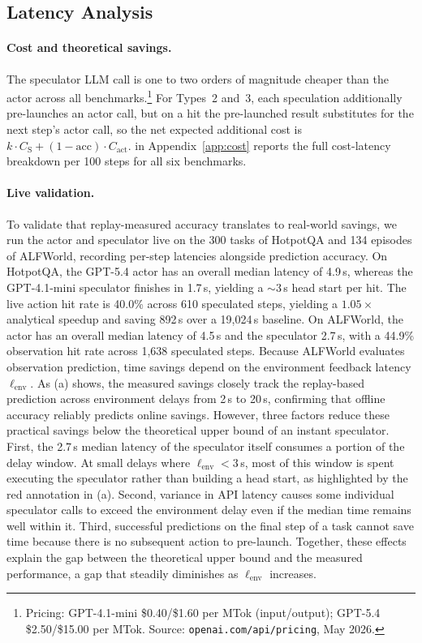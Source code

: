 \documentclass{article}
\begin{document}
\subsection{Latency Analysis}
\label{sec:cost_benefit}

\paragraph{Cost and theoretical savings.}
The speculator LLM call is one to two orders of magnitude cheaper than the actor across all benchmarks.\footnote{Pricing:
GPT-4.1-mini \$0.40/\$1.60 per MTok (input/output);
GPT-5.4 \$2.50/\$15.00 per MTok.
Source: \texttt{openai.com/api/pricing}, May 2026.} For Types~2 and~3, each speculation additionally pre-launches an actor call, but on a hit the pre-launched result substitutes for the next step's actor call, so the net expected additional cost is $k \cdot C_{\text{S}} + (1 - \text{acc}) \cdot C_{\text{act}}$.  in Appendix~\ref{app:cost} reports the full cost-latency breakdown per 100 steps for all six benchmarks.

\paragraph{Live validation.}
To validate that replay-measured accuracy translates to real-world savings, we run the actor and speculator live on the 300 tasks of HotpotQA and 134 episodes of ALFWorld, recording per-step latencies alongside prediction accuracy. On HotpotQA, the GPT-5.4 actor has an overall median latency of 4.9\,s, whereas the GPT-4.1-mini speculator finishes in 1.7\,s, yielding a $\sim$3\,s head start per hit. The live action hit rate is 40.0\% across 610 speculated steps, yielding a $1.05\times$ analytical speedup and saving 892\,s over a 19,024\,s baseline. On ALFWorld, the actor has an overall median latency of 4.5\,s and the speculator 2.7\,s, with a 44.9\% observation hit rate across 1,638 speculated steps. Because ALFWorld evaluates observation prediction, time savings depend on the environment feedback latency $\ell_{\text{env}}$. As (a) shows, the measured savings closely track the replay-based prediction across environment delays from 2\,s to 20\,s, confirming that offline accuracy reliably predicts online savings. However, three factors reduce these practical savings below the theoretical upper bound of an instant speculator. First, the 2.7\,s median latency of the speculator itself consumes a portion of the delay window. At small delays where $\ell_{\text{env}} < 3$\,s, most of this window is spent executing the speculator rather than building a head start, as highlighted by the red annotation in (a). Second, variance in API latency causes some individual speculator calls to exceed the environment delay even if the median time remains well within it. Third, successful predictions on the final step of a task cannot save time because there is no subsequent action to pre-launch. Together, these effects explain the gap between the theoretical upper bound and the measured performance, a gap that steadily diminishes as $\ell_{\text{env}}$ increases.
\end{document}
